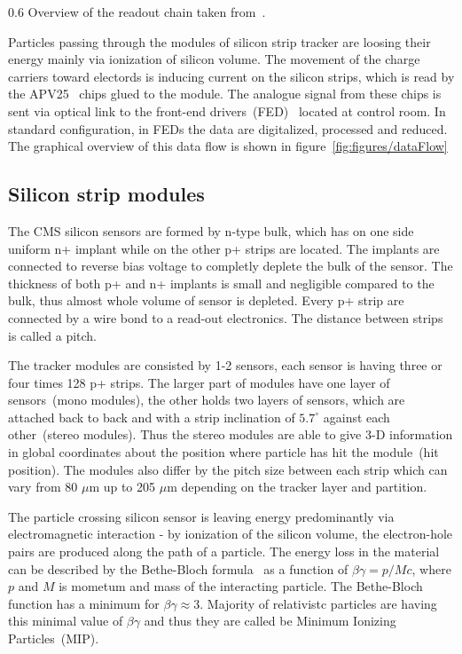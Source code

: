                  {0.6}       %
                 {Overview of the readout chain taken from~\cite{Bainbridge:2004jc}.} %

Particles passing through the modules of silicon strip tracker are loosing their energy mainly via ionization of silicon volume. The movement of the charge carriers toward electords is inducing current on the silicon strips, which is read by the APV25~\cite{French:2001xb} chips glued to the module. The analogue signal from these chips is sent via optical link to the front-end drivers~(FED)~\cite{Baird:2002wg} located at control room. In standard configuration, in FEDs the data are digitalized, processed and reduced. The graphical overview of this data flow is shown in figure~\ref{fig:figures/dataFlow}

\subsection{Silicon strip modules}

The CMS silicon sensors are formed by n-type bulk, which has on one side uniform n+ implant while on the other p+ strips are located. The implants are connected to reverse bias voltage to completly deplete the bulk of the sensor. The thickness of both p+ and n+ implants is small and negligible compared to the bulk, thus almost whole volume of sensor is depleted. Every p+ strip are connected by a wire bond to a read-out electronics. The distance between strips is called a pitch.

The tracker modules are consisted by 1-2 sensors, each sensor is having three or four times 128 p+ strips. The larger part of modules have one layer of sensors~(mono modules), the other holds two layers of sensors, which are attached back to back and with a strip inclination of $5.7^{\circ}$ against each other~(stereo modules). Thus the stereo modules are able to give 3-D information in global coordinates about the position where particle has hit the module~(hit position). The modules also differ by the pitch size between each strip which can vary from 80 $\mu$m up to 205 $\mu$m depending on the tracker layer and partition.

The particle crossing silicon sensor is leaving energy predominantly via electromagnetic interaction - by ionization of the silicon volume, the electron-hole pairs are produced along the path of a particle. The energy loss in the material can be described by the Bethe-Bloch formula~\cite{Groom:2000sm} as a function of $\beta\gamma = p/Mc$, where $p$ and $M$ is mometum and mass of the interacting particle. The Bethe-Bloch function has a minimum for $\beta\gamma \approx 3$. Majority of relativistc particles are having this minimal value of $\beta\gamma$ and thus they are called be Minimum Ionizing Particles~(MIP).


